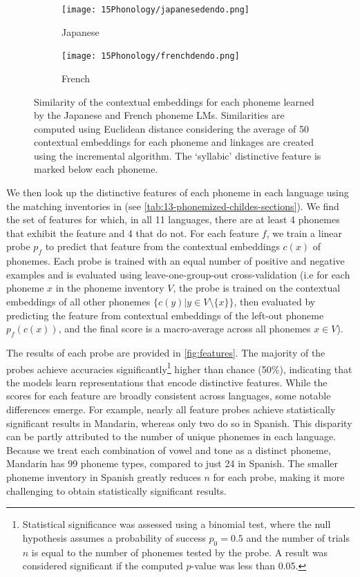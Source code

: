 \begin{figure}[t]
    \centering
    \begin{subfigure}[][][]{0.49\textwidth}
        \texttt{[image: 15Phonology/japanesedendo.png]}
        \caption{Japanese}
    \end{subfigure}
    \begin{subfigure}[][][]{0.49\textwidth}
        \texttt{[image: 15Phonology/frenchdendo.png]}
        \caption{French}
    \end{subfigure}
    \caption{Similarity of the contextual embeddings for each phoneme learned by the Japanese and French phoneme LMs. Similarities are computed using Euclidean distance considering the average of 50 contextual embeddings for each phoneme and linkages are created using the incremental algorithm. The `syllabic' distinctive feature is marked below each phoneme.} 
    \label{fig:dendrogram}
\end{figure}

We then look up the distinctive features of each phoneme in each language using the matching inventories in \phoible (see \cref{tab:13-phonemized-childes-sections}). We find the set of features for which, in all 11 languages, there are at least 4 phonemes that exhibit the feature and 4 that do not. 
For each feature $f$, we train a linear probe $p_f$ to predict that feature from the contextual embeddings $c(x)$ of phonemes. Each probe is trained with an equal number of positive and negative examples and is evaluated using leave-one-group-out cross-validation (i.e for each phoneme $x$ in the phoneme inventory $V$, the probe is trained on the contextual embeddings of all other phonemes $\{c(y) | y\in V \setminus \{x\}\}$, then evaluated by predicting the feature from contextual embeddings of the left-out phoneme $p_f(c(x))$, and the final score is a macro-average across all phonemes $x\in V$).

The results of each probe are provided in \cref{fig:features}. The majority of the probes achieve accuracies significantly\footnote{Statistical significance was assessed using a binomial test, where the null hypothesis assumes a probability of success \( p_0 = 0.5 \) and the number of trials \( n \) is equal to the number of phonemes tested by the probe. A result was considered significant if the computed \( p \)-value was less than 0.05.} higher than chance (50\%), indicating that the models learn representations that encode distinctive features. While the scores for each feature are broadly consistent across languages, some notable differences emerge. For example, nearly all feature probes achieve statistically significant results in Mandarin, whereas only two do so in Spanish. This disparity can be partly attributed to the number of unique phonemes in each language. Because we treat each combination of vowel and tone as a distinct phoneme, Mandarin has 99 phoneme types, compared to just 24 in Spanish. The smaller phoneme inventory in Spanish greatly reduces $n$ for each probe, making it more challenging to obtain statistically significant results.

